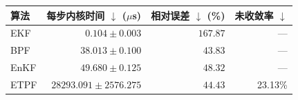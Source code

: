 \begin{tabular}{lrrr}
\toprule[1.5pt]
算法 & 每步内核时间 $\downarrow$ ($\mu$s) & 相对误差 $\downarrow$ (\%) & 未收敛率 $\downarrow$ \\
\midrule[1pt]
EKF & $\mathbf{0.104}\pm 0.003$ & $167.87$ & — \\
BPF & $38.013\pm 0.100$ & $\mathbf{43.83}$ & — \\
EnKF & $49.680\pm 0.125$ & $48.32$ & — \\
ETPF & $28293.091\pm 2576.275$ & $44.43$ & 23.13\% \\
\bottomrule[1.5pt]
\end{tabular}
